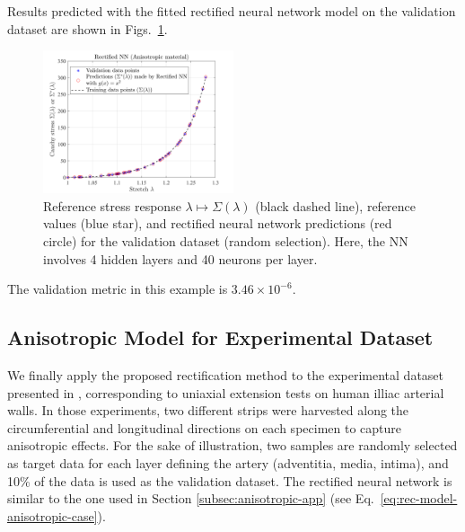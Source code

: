 Results predicted with the fitted rectified neural network model on the validation dataset are shown in Figs.~\ref{fig:ANI best result 1}.
\begin{figure}[ht!]
    \begin{center}
        \includegraphics[width=0.5\textwidth]{Pictures/sigma_ANI.png}
    \end{center}
    \caption[Reference stress response $\lambda \mapsto \Sigma(\lambda)$, reference values, and rectified neural network predictions.]{Reference stress response $\lambda \mapsto \Sigma(\lambda)$ (black dashed line), reference values (blue star), and rectified neural network predictions (red circle) for the validation dataset (random selection). Here, the NN involves 4 hidden layers and 40 neurons per layer.}
    \label{fig:ANI best result 1}
\end{figure}
The validation metric in this example is $3.46 \times 10^{-6}$.

\subsection{Anisotropic Model for Experimental Dataset}\label{subsec:exp-app}
We finally apply the proposed rectification method to the experimental dataset presented in \cite{holzapfel2005determination}, corresponding to uniaxial extension tests on human illiac arterial walls. In those experiments, two different strips were harvested along the circumferential and longitudinal directions on each specimen to capture anisotropic effects. For the sake of illustration, two samples are randomly selected as target data for each layer defining the artery (adventitia, media, intima), and 10\% of the data is used as the validation dataset. The rectified neural network is similar to the one used in Section \ref{subsec:anisotropic-app} (see Eq.~\eqref{eq:rec-model-anisotropic-case}). 

